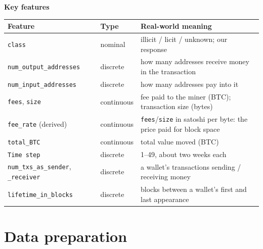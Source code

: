 \documentclass[10pt,a4paper,twocolumn]{article}
\newcommand{\minihead}[1]{\par\Needspace{8\baselineskip}\smallskip\textbf{#1}\par}
\newcommand{\code}[1]{\texttt{#1}}
\begin{document}
\minihead{Key features}
{\footnotesize
\begin{tabularx}{\linewidth}{@{}L{2.6cm} L{1.3cm} Y@{}}
\toprule
\textbf{Feature} & \textbf{Type} & \textbf{Real-world meaning} \\
\midrule
\code{class} & nominal & illicit / licit / unknown; our response \\
\code{num\_output\_}\allowbreak\code{addresses} & discrete & how many addresses receive money in the transaction \\
\code{num\_input\_}\allowbreak\code{addresses} & discrete & how many addresses pay into it \\
\code{fees}, \code{size} & continuous & fee paid to the miner (BTC); transaction size (bytes) \\
\code{fee\_rate} (derived) & continuous & \code{fees}/\code{size} in satoshi per byte: the price paid for block space \\
\code{total\_BTC} & continuous & total value moved (BTC) \\
\code{Time step} & discrete & 1--49, about two weeks each \\
\code{num\_txs\_as\_sender}, \code{\_receiver} & discrete & a wallet's transactions sending / receiving money \\
\code{lifetime\_}\allowbreak\code{in\_blocks} & discrete & blocks between a wallet's first and last appearance \\
\bottomrule
\end{tabularx}}

\section{Data preparation}
\end{document}

